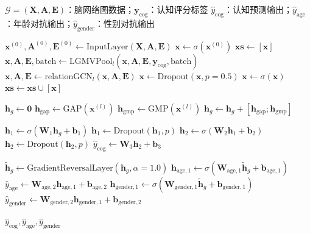 \begin{algorithm}
  \centering
  \caption{LGUNet\_rela 模型前向传播（含GRL对抗机制）}
  \label{alg:lgpunet_rela_forward}
  \small
  \begin{algorithmic}[1]
  \REQUIRE $\mathcal{G} = (\mathbf{X}, \mathbf{A}, \mathbf{E})$：脑网络图数据；$\mathbf{y}_{\text{cog}}$：认知评分标签
  \ENSURE $\hat{y}_{\text{cog}}$：认知预测输出；$\hat{y}_{\text{age}}$：年龄对抗输出；$\hat{y}_{\text{gender}}$：性别对抗输出

  \STATE {}
  \STATE $\mathbf{x}^{(0)}, \mathbf{A}^{(0)}, \mathbf{E}^{(0)} \leftarrow \text{InputLayer}(\mathbf{X}, \mathbf{A}, \mathbf{E})$
  \STATE $\mathbf{x} \leftarrow \sigma(\mathbf{x}^{(0)})$
  \STATE $\mathbf{xs} \leftarrow [\mathbf{x}]$
  \STATE {}
    \STATE $\mathbf{x}, \mathbf{A}, \mathbf{E}, \text{batch} \leftarrow \text{LGMVPool}_l(\mathbf{x}, \mathbf{A}, \mathbf{E}, \mathbf{y}_{\text{cog}}, \text{batch})$
    \STATE $\mathbf{x}, \mathbf{A}, \mathbf{E} \leftarrow \text{relationGCN}_l(\mathbf{x}, \mathbf{A}, \mathbf{E})$
    \STATE $\mathbf{x} \leftarrow \text{Dropout}(\mathbf{x}, p=0.5)$
    \STATE $\mathbf{x} \leftarrow \sigma(\mathbf{x})$
    \STATE $\mathbf{xs} \leftarrow \mathbf{xs} \cup [\mathbf{x}]$
  \ENDFOR

  \STATE {}
  \STATE $\mathbf{h}_g \leftarrow \mathbf{0}$
    \STATE $\mathbf{h}_{\text{gap}} \leftarrow \text{GAP}(\mathbf{x}^{(l)})$
    \STATE $\mathbf{h}_{\text{gmp}} \leftarrow \text{GMP}(\mathbf{x}^{(l)})$
    \STATE $\mathbf{h}_g \leftarrow \mathbf{h}_g + [\mathbf{h}_{\text{gap}} ; \mathbf{h}_{\text{gmp}}]$
  \ENDFOR

  \STATE {}
  \STATE $\mathbf{h}_1 \leftarrow \sigma(\mathbf{W}_1 \mathbf{h}_g + \mathbf{b}_1)$
  \STATE $\mathbf{h}_1 \leftarrow \text{Dropout}(\mathbf{h}_1, p)$
  \STATE $\mathbf{h}_2 \leftarrow \sigma(\mathbf{W}_2 \mathbf{h}_1 + \mathbf{b}_2)$
  \STATE $\mathbf{h}_2 \leftarrow \text{Dropout}(\mathbf{h}_2, p)$
  \STATE $\hat{y}_{\text{cog}} \leftarrow \mathbf{W}_3 \mathbf{h}_2 + \mathbf{b}_3$

  \STATE {}
  \STATE $\tilde{\mathbf{h}}_g \leftarrow \text{GradientReversalLayer}(\mathbf{h}_g, \alpha=1.0)$
  \STATE $\mathbf{h}_{\text{age},1} \leftarrow \sigma(\mathbf{W}_{\text{age},1} \tilde{\mathbf{h}}_g + \mathbf{b}_{\text{age},1})$
  \STATE $\hat{y}_{\text{age}} \leftarrow \mathbf{W}_{\text{age},2} \mathbf{h}_{\text{age},1} + \mathbf{b}_{\text{age},2}$
  \STATE $\mathbf{h}_{\text{gender},1} \leftarrow \sigma(\mathbf{W}_{\text{gender},1} \tilde{\mathbf{h}}_g + \mathbf{b}_{\text{gender},1})$
  \STATE $\hat{y}_{\text{gender}} \leftarrow \mathbf{W}_{\text{gender},2} \mathbf{h}_{\text{gender},1} + \mathbf{b}_{\text{gender},2}$

  \RETURN $\hat{y}_{\text{cog}}, \hat{y}_{\text{age}}, \hat{y}_{\text{gender}}$
  \end{algorithmic}
\end{algorithm}

